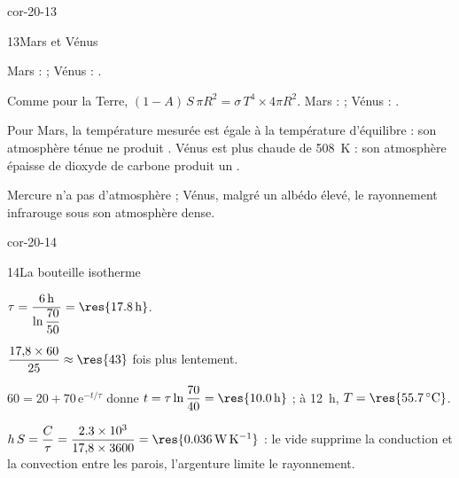 \begin{blocLivre}{cor-20-13}
\begin{corrige}{13}{Mars et Vénus}
\begin{questions}
\item Mars :  ; Vénus : .
\item Comme pour la Terre, $(1-A)\,S\,\pi R^2=\sigma\,T^4\times4\pi R^2$. Mars :  ; Vénus : .
\item Pour Mars, la température mesurée est égale à la température d'équilibre : son atmosphère ténue ne produit
. Vénus est plus chaude de \qty{508}{K} : son atmosphère épaisse de dioxyde de
carbone produit un .
\item Mercure n'a pas d'atmosphère ; Vénus, malgré un albédo élevé,  le rayonnement infrarouge sous son
atmosphère dense.
\end{questions}
\end{corrige}
\end{blocLivre}
\begin{blocLivre}{cor-20-14}
\begin{corrige}{14}{La bouteille isotherme}
\begin{questions}
\item $\tau=\dfrac{\qty{6}{h}}{\ln\dfrac{70}{50}}=\res{\qty{17,8}{h}}$.
\item $\dfrac{17{,}8\times60}{25}\approx\res{43}$ fois plus lentement.
\item $60=20+70\,\mathrm{e}^{-t/\tau}$ donne $t=\tau\ln\dfrac{70}{40}=\res{\qty{10,0}{h}}$ ; à 12~h, $T=\res{\qty{55,7}{\degreeCelsius}}$.
\item $h\,S=\dfrac{C}{\tau}=\dfrac{\num{2.3e3}}{17{,}8\times3600}=\res{\qty{0,036}{W.K^{-1}}}$ : le vide supprime la conduction et la
convection entre les parois, l'argenture limite le rayonnement.
\end{questions}
\end{corrige}
\end{blocLivre}
